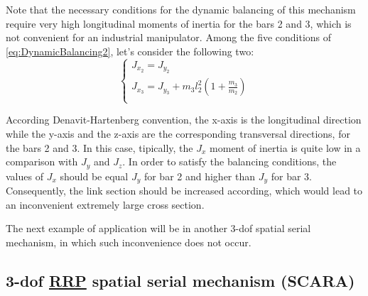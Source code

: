 \documentclass[a4paper,11pt,brazil,fleqn]{article}
\begin{document}
Note that the necessary conditions for the dynamic balancing of this mechanism require very high longitudinal moments of inertia  for the bars 2 and 3, which is not convenient for an industrial manipulator. Among the five conditions of \eqref{eq:DynamicBalancing2}, let's consider the following two:
\begin{equation}\label{eq:DynamicBalancing2_}
\begin{cases}
J_{x_2} = J_{y_2} \\
J_{x_3} = J_{y_3} + m_3 l_2^2 ( 1 + \frac{m_3}{m_2} )\\
\end{cases}
\end{equation}

According Denavit-Hartenberg convention, the x-axis is the longitudinal direction while the y-axis and the z-axis are the corresponding transversal directions, for the bars 2 and 3. In this case, tipically, the $J_x$ moment of inertia is quite low in a comparison with $J_y$ and $J_z$. In order to satisfy the balancing conditions, the values of $J_x$ should be equal $J_y$ for bar 2 and  higher than $J_y$ for bar 3. Consequently, the link section should be increased according, which would lead to an inconvenient extremely large cross section.


The next example of application will be in another 3-dof spatial serial mechanism, in which such inconvenience does not occur.

\subsection{3-dof \underline{RRP} spatial serial mechanism (SCARA)} \label{S03-2}
\end{document}
